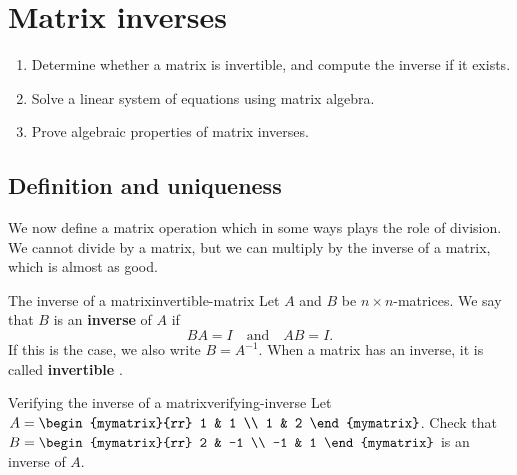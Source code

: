 \section{Matrix inverses}

\begin{outcome}
  \begin{enumerate}
  \item Determine whether a matrix is invertible, and compute the
    inverse if it exists.
  \item Solve a linear system of equations using matrix algebra.
  \item Prove algebraic properties of matrix inverses.
  \end{enumerate}
\end{outcome}

\subsection{Definition and uniqueness}

We now define a matrix operation which in some ways plays the role
of division. We cannot divide by a matrix, but we can multiply by the
inverse of a matrix, which is almost as good.

\begin{definition}{The inverse of a matrix}{invertible-matrix}
  Let $A$ and $B$ be $n\times n$-matrices. We say that $B$ is an
  \textbf{inverse}%
   of $A$ if
  \begin{equation*}
    BA=I\quad\mbox{and}\quad
    AB=I.
  \end{equation*}
  If this is the case, we also write $B=A^{-1}$. When a matrix has an
  inverse, it is called \textbf{invertible}%
  .
\end{definition}

\begin{example}{Verifying the inverse of a matrix}{verifying-inverse}
  Let $A=\begin{mymatrix}{rr}
    1 & 1 \\
    1 & 2
  \end{mymatrix}$. Check that $B=\begin{mymatrix}{rr}
    2 & -1 \\
    -1 & 1
  \end{mymatrix}$ is an inverse of $A$.
\end{example}

